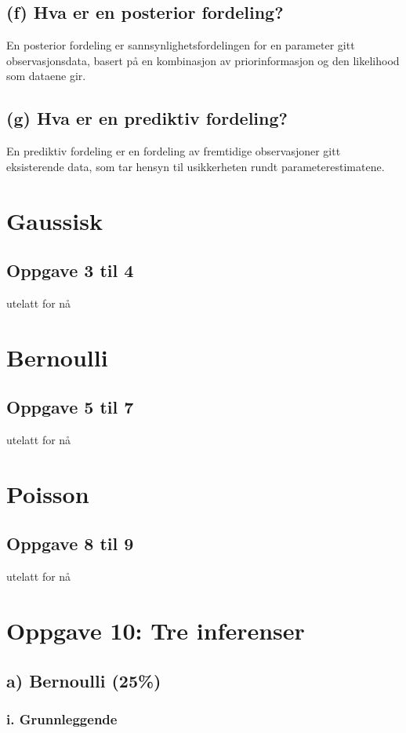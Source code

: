 \documentclass{article}
\begin{document}
\subsection*{(f) Hva er en posterior fordeling?}
En posterior fordeling er sannsynlighetsfordelingen for en parameter gitt observasjonsdata, basert på en kombinasjon av priorinformasjon og den likelihood som dataene gir.

\subsection*{(g) Hva er en prediktiv fordeling?}
En prediktiv fordeling er en fordeling av fremtidige observasjoner gitt eksisterende data, som tar hensyn til usikkerheten rundt parameterestimatene.

\section{Gaussisk}
\subsection{Oppgave 3 til 4}
utelatt for nå

\section{Bernoulli}
\subsection{Oppgave 5 til 7}
utelatt for nå

\section{Poisson}
\subsection{Oppgave 8 til 9}
utelatt for nå


\section{Oppgave 10: Tre inferenser}

\subsection*{a) Bernoulli (25\%)}

\subsubsection*{i. Grunnleggende}
\end{document}
